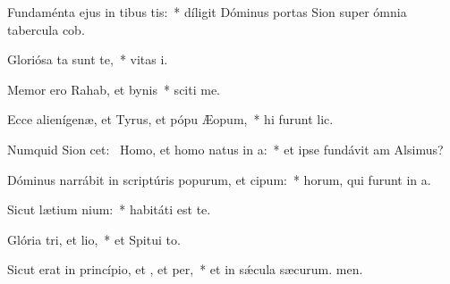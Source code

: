 \item Fundaménta ejus in tibus tis:~* díligit Dóminus portas Sion super ómnia tabercula cob.
\item Gloriósa ta sunt  te,~* vitas i.
\item Memor ero Rahab, et bynis~* sciti me.
\item Ecce alienígenæ, et Tyrus, et pópu Æopum,~* hi furunt lic.
\item Numquid Sion cet:~\pscross{} Homo, et homo natus  in a:~* et ipse fundávit am Alsimus?
\item Dóminus narrábit in scriptúris popurum, et cipum:~* horum, qui furunt in a.
\item Sicut lætium nium:~* habitáti est  te.
\item Glória tri, et lio,~* et Spitui to.
\item Sicut erat in princípio, et , et per,~* et in sǽcula sæcurum. men.
